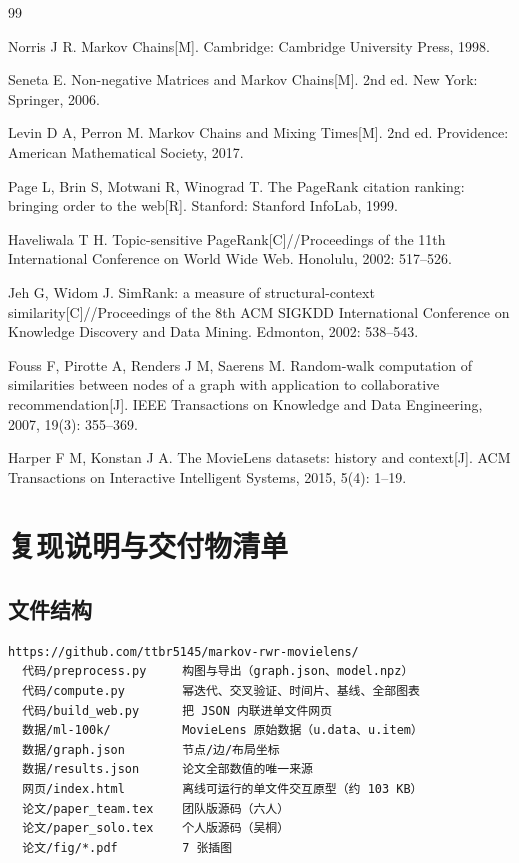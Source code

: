 \documentclass[12pt,a4paper]{ctexart}
\begin{document}
\newpage
\begin{thebibliography}{99}
\small
\setlength{\itemsep}{0.2em}

 Norris J R. Markov Chains[M]. Cambridge: Cambridge University Press, 1998.

 Seneta E. Non-negative Matrices and Markov Chains[M]. 2nd ed. New York: Springer, 2006.

 Levin D A, Perron M. Markov Chains and Mixing Times[M]. 2nd ed. Providence: American Mathematical Society, 2017.

 Page L, Brin S, Motwani R, Winograd T. The PageRank citation ranking: bringing order to the web[R]. Stanford: Stanford InfoLab, 1999.

 Haveliwala T H. Topic-sensitive PageRank[C]//Proceedings of the 11th International Conference on World Wide Web. Honolulu, 2002: 517--526.

 Jeh G, Widom J. SimRank: a measure of structural-context similarity[C]//Proceedings of the 8th ACM SIGKDD International Conference on Knowledge Discovery and Data Mining. Edmonton, 2002: 538--543.

 Fouss F, Pirotte A, Renders J M, Saerens M. Random-walk computation of similarities between nodes of a graph with application to collaborative recommendation[J]. IEEE Transactions on Knowledge and Data Engineering, 2007, 19(3): 355--369.

 Harper F M, Konstan J A. The MovieLens datasets: history and context[J]. ACM Transactions on Interactive Intelligent Systems, 2015, 5(4): 1--19.

\end{thebibliography}

\newpage
\appendix
\section{复现说明与交付物清单}

\subsection{文件结构}

\begin{verbatim}
https://github.com/ttbr5145/markov-rwr-movielens/
  代码/preprocess.py     构图与导出（graph.json、model.npz）
  代码/compute.py        幂迭代、交叉验证、时间片、基线、全部图表
  代码/build_web.py      把 JSON 内联进单文件网页
  数据/ml-100k/          MovieLens 原始数据（u.data、u.item）
  数据/graph.json        节点/边/布局坐标
  数据/results.json      论文全部数值的唯一来源
  网页/index.html        离线可运行的单文件交互原型（约 103 KB）
  论文/paper_team.tex    团队版源码（六人）
  论文/paper_solo.tex    个人版源码（吴桐）
  论文/fig/*.pdf         7 张插图
\end{verbatim}
\end{document}
